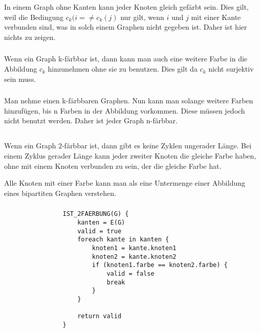 \documentclass[10pt,a4paper,oneside,ngerman,numbers=noenddot]{scrartcl}
\begin{document}
\section{} %
	\subsection{} %
		\subsubsection{} %
			In einem Graph ohne Kanten kann jeder Knoten gleich gefärbt sein. Dies gilt, weil die Bedingung $c_{k}(i= \neq c_{k}(j)$ nur gilt, wenn $i$ und $j$ mit einer Kante verbunden sind, was in solch einem Graphen nicht gegeben ist. Daher ist hier nichts zu zeigen.
		\subsubsection{} %
			Wenn ein Graph k-färbbar ist, dann kann man auch eine weitere Farbe in die Abbildung $c_{k}$ hinzunehmen ohne sie zu benutzen. Dies gilt da $c_{k}$ nicht surjektiv sein muss.
		\subsubsection{} %
			Man nehme einen k-färbbaren Graphen. Nun kann man solange weitere Farben hinzufügen, bis n Farben in der Abbildung vorkommen. Diese müssen jedoch nicht benutzt werden. Daher ist jeder Graph n-färbbar.
	\subsection{} %
		\subsubsection{} %
			Wenn ein Graph 2-färbbar ist, dann gibt es keine Zyklen ungerader Länge. Bei einem Zyklus gerader Länge kann jeder zweiter Knoten die gleiche Farbe haben, ohne mit einem Knoten verbunden zu sein, der die gleiche Farbe hat.
			
			Alle Knoten mit einer Farbe kann man als eine Untermenge einer Abbildung eines bipartiten Graphen verstehen.
		\subsubsection{} %
			\begin{verbatim}
			    IST_2FAERBUNG(G) {
			        kanten = E(G)
			        valid = true
			        foreach kante in kanten {
			            knoten1 = kante.knoten1
			            knoten2 = kante.knoten2
			            if (knoten1.farbe == knoten2.farbe) {
			                valid = false
			                break
			            }
			        }
			        
			        return valid
			    }
			\end{verbatim}
\end{document}
